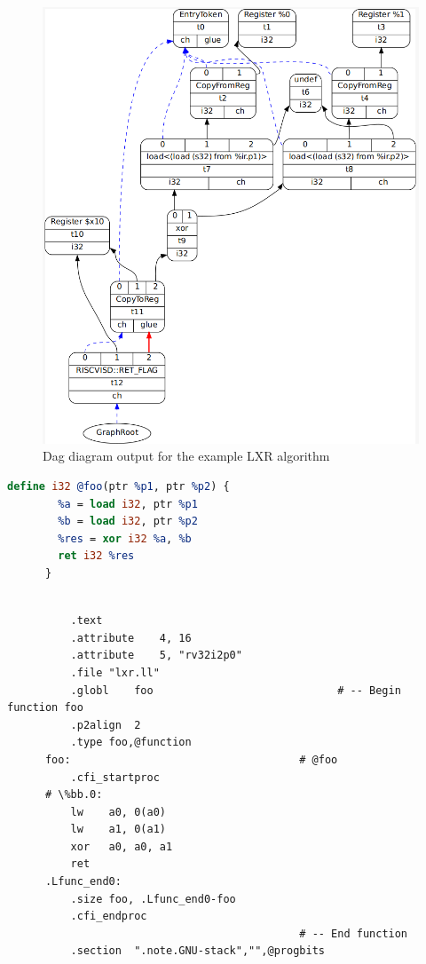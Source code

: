 \begin{figure}
    \centering
    \includegraphics[scale=0.5]{adding_new_instr/lxr_dag_diagram.png}
    \caption{Dag diagram output for the example LXR algorithm}
    \label{fig:lxr_dag_diagram}
\end{figure}

\begin{lstlisting}[caption={Intermediate Representation code input for LXR algorithm}, language=llvm, style=nasm]
    define i32 @foo(ptr %p1, ptr %p2) {
        %a = load i32, ptr %p1
        %b = load i32, ptr %p2
        %res = xor i32 %a, %b
        ret i32 %res
      }
\end{lstlisting}



\begin{lstlisting}[caption= Assembly output without LXR instruction]
      
          .text
          .attribute	4, 16
          .attribute	5, "rv32i2p0"
          .file	"lxr.ll"
          .globl	foo                             # -- Begin function foo
          .p2align	2
          .type	foo,@function
      foo:                                    # @foo
          .cfi_startproc
      # \%bb.0:
          lw	a0, 0(a0)
          lw	a1, 0(a1)
          xor	a0, a0, a1
          ret
      .Lfunc_end0:
          .size	foo, .Lfunc_end0-foo
          .cfi_endproc
                                              # -- End function
          .section	".note.GNU-stack","",@progbits
      
      
\end{lstlisting}


